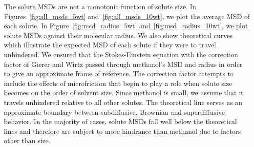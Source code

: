 \documentclass{article}
\begin{document}
  The solute MSDs are not a monotonic function of solute size. In 
  Figures~\ref{fig:all_msds_5wt} and~\ref{fig:all_msds_10wt}, we plot
  the average MSD of each solute. In Figure~\ref{fig:msd_radius_5wt} 
  and~\ref{fig:msd_radius_10wt}, we plot solute MSDs against their
  molecular radius. We also show theoretical curves which illustrate the 
  expected MSD of each solute if they were to travel unhindered. We 
  ensured that the Stokes-Einstein equation with the correction factor
  of Gierer and Wirtz\cite{gierer_molekulare_1953} passed through methanol's MSD and radius
  in order to give an approximate frame of reference. The correction 
  factor attempts to include the effects of microfriction that begin to 
  play a role when solute size becomes on the order of solvent size. 
  Since methanol is small, we assume that it travels unhindered relative 
  to all other solutes. The theoretical line serves as an approximate 
  boundary between subdiffusive, Brownian and superdiffusive behavior.
  In the majority of cases, solute MSDs fall well below the theoretical
  lines and therefore are subject to more hindrance than methanol due to
  factors other than size.
  
\end{document}
